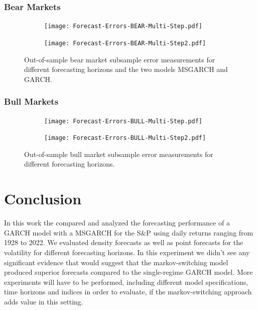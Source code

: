\documentclass[11pt,a4paper]{article}
\begin{document}
\subsubsection{Bear Markets}
\begin{figure}[H]
	\label{fig:bear-error-multi-step}
	\begin{subfigure}{1.2\textwidth}
		\centering
		\texttt{[image: Forecast-Errors-BEAR-Multi-Step.pdf]}
	\end{subfigure}
	
	\begin{subfigure}{1.2\textwidth}
		\centering
		\texttt{[image: Forecast-Errors-BEAR-Multi-Step2.pdf]}
	\end{subfigure}
	\caption{Out-of-sample bear market subsample error measurements for different forecasting horizons and the two models MSGARCH and GARCH.}
\end{figure}


\subsubsection{Bull Markets}
\begin{figure}[H]
	\label{fig:bull-error-multi-step}
	\begin{subfigure}{1.2\textwidth}
		\centering
		\texttt{[image: Forecast-Errors-BULL-Multi-Step.pdf]}
	\end{subfigure}
	
	\begin{subfigure}{1.2\textwidth}
		\centering
		\texttt{[image: Forecast-Errors-BULL-Multi-Step2.pdf]}
	\end{subfigure}
	\caption{Out-of-sample bull market subsample error measurements for different forecasting horizons.}
\end{figure}

\section{Conclusion}
In this work the compared and analyzed the forecasting performance of a GARCH model with a \ac*{MSGARCH} for the S\&P using daily returns ranging from 1928 to 2022. We evaluated density forecasts as well as point forecasts for the volatility for different forecasting horizons. In this experiment we didn't see any significant evidence that would suggest that the markov-switching model produced superior forecasts compared to the single-regime \ac{GARCH} model. More experiments will have to be performed, including different model specifications, time horizons and indices in order to evaluate, if the markov-switching approach adds value in this setting.
\end{document}
